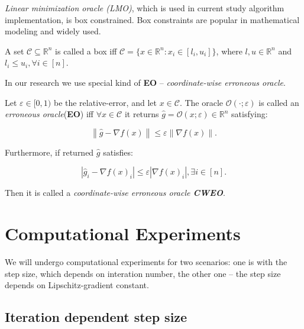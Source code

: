 \documentclass[runningheads, final]{llncs}
\newcommand{\norm}[1]{\left\lVert#1\right\rVert}
\newcommand{\errgrad}{\hat{g}}
\begin{document}
\textit{Linear minimization oracle (LMO)}, which is used in current study
algorithm implementation, is box constrained. Box constraints are popular in
mathematical modeling and widely used.

\begin{definition}
    A set $\mathcal{C} \subseteq \mathbb{R}^n$ is called a box iff
    $\mathcal{C} = \{x \in \mathbb{R}^n: x_i \in [l_i, u_i]\}$, where $l, u \in
        \mathbb{R}^n$ and $l_i \leqslant u_i, \forall i \in [n]$.
\end{definition}

In our research we use special kind of \textbf{EO} -- \textit{coordinate-wise
    erroneous oracle}.

\begin{definition}
    Let $\varepsilon \in [0, 1)$ be the relative-error, and let
    $x \in \mathcal{C}$. The oracle $\mathcal{O}(\cdot; \varepsilon)$ is called
    an \textit{erroneous oracle}(\textbf{EO}) iff $\forall x \in \mathcal{C}$ it
    returns $\errgrad = \mathcal{O}(x; \varepsilon) \in \mathbb{R}^n$
    satisfying:

    \begin{equation}
        \norm{\errgrad - \nabla f(x)} \leqslant \varepsilon \norm{\nabla f(x)}.
    \end{equation}

    Furthermore, if returned $\errgrad$ satisfies:

    \begin{equation}
        |\errgrad_i - \nabla f(x)_i| \leqslant \varepsilon |\nabla f(x)_i|,
        \exists i \in [n].
    \end{equation}

    Then it is called a \textit{coordinate-wise erroneous oracle \textbf{CWEO}}.

\end{definition}

\section{Computational Experiments}\label{sec:experiments}

We will undergo computational experiments for two scenarios: one is with
the step size, which depends on interation number, the other one -- the step
size depends on Lipschitz-gradient constant.

\subsection{Iteration dependent step size}
\end{document}
